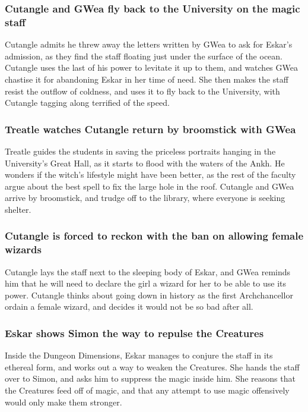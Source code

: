 \subsubsection{\Gls{Cutangle} and \Gls{GWea} fly back to the University on the magic staff}
\Gls{Cutangle} admits he threw away the letters written by \Gls{GWea} to ask for \Gls{Eskar}'s
admission, as they find the staff floating just under the surface of the ocean. \Gls{Cutangle} uses
the last of his power to levitate it up to them, and watches \Gls{GWea} chastise it for abandoning
\Gls{Eskar} in her time of need. She then makes the staff resist the outflow of coldness, and
uses it to fly back to the University, with \Gls{Cutangle} tagging along terrified of the speed.

\subsubsection{\Gls{Treatle} watches \Gls{Cutangle} return by broomstick with \Gls{GWea}}
\Gls{Treatle} guides the students in saving the priceless portraits hanging in the University's
Great Hall, as it starts to flood with the waters of the Ankh. He wonders if the witch's lifestyle
might have been better, as the rest of the faculty argue about the best spell to fix the large hole
in the roof. \Gls{Cutangle} and \Gls{GWea} arrive by broomstick, and trudge off to the library,
where everyone is seeking shelter.

\subsubsection{\Gls{Cutangle} is forced to reckon with the ban on allowing female wizards}
\Gls{Cutangle} lays the staff next to the sleeping body of \Gls{Eskar}, and \Gls{GWea} reminds him
that he will need to declare the girl a wizard for her to be able to use its power. \Gls{Cutangle}
thinks about going down in history as the first Archchancellor ordain a female wizard, and decides
it would not be so bad after all.

\subsubsection{\Gls{Eskar} shows \Gls{Simon} the way to repulse the Creatures}
Inside the Dungeon Dimensions, \Gls{Eskar} manages to conjure the staff in its ethereal form, and
works out a way to weaken the Creatures. She hands the staff over to \Gls{Simon}, and asks him to
suppress the magic inside him. She reasons that the Creatures feed off of magic, and that any
attempt to use magic offensively would only make them stronger.

